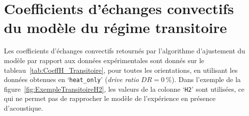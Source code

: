 \chapter{Coefficients d'échanges convectifs du modèle du régime transitoire}\label{chap:CoeffH_Transitoire}

Les coefficients d'échanges convectifs retournés par l'algorithme d'ajustement du modèle par rapport aux données expérimentales sont donnés sur le tableau~\ref{tab:CoeffH_Transitoire}, pour toutes les orientations, en utilisant les données obtenues en `\texttt{heat\_only}' (\textit{drive ratio} $DR=\qty{0}{\percent}$). Dans l'exemple de la figure~\ref{fig:ExempleTransitoireH2}, les valeurs de la colonne `\texttt{H2}' sont utilisées, ce qui ne permet pas de rapprocher le modèle de l'expérience en présence d'acoustique.

